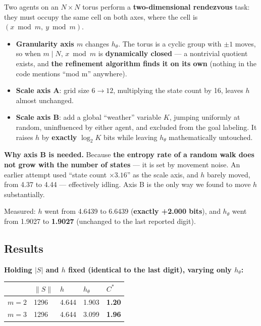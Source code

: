 \documentclass[11pt]{article}
\providecommand{\tightlist}{%
  \setlength{\itemsep}{0pt}\setlength{\parskip}{0pt}}
\renewenvironment{quote}
  {\def\FrameCommand{{\color{gray!60}\vrule width 2pt}\hspace{8pt}}%
   \MakeFramed{\advance\hsize-\width \FrameRestore}\begin{itshape}}
  {\end{itshape}\endMakeFramed}
\begin{document}
Two agents on an \(N\times N\) torus perform a \textbf{two-dimensional rendezvous} task: they must occupy the same cell on both axes, where the cell is \((x\bmod m,\ y\bmod m)\).

\begin{itemize}
\tightlist
\item
  \textbf{Granularity axis \(m\)} changes \(h_\theta\). The torus is a cyclic group with \(\pm1\) moves, so when \(m\mid N\), \(x\bmod m\) is \textbf{dynamically closed} --- a nontrivial quotient exists, and \textbf{the refinement algorithm finds it on its own} (nothing in the code mentions ``mod m'' anywhere).
\item
  \textbf{Scale axis A}: grid size \(6\to12\), multiplying the state count by 16, leaves \(h\) almost unchanged.
\item
  \textbf{Scale axis B}: add a global ``weather'' variable \(K\), jumping uniformly at random, uninfluenced by either agent, and excluded from the goal labeling. It raises \(h\) by \textbf{exactly} \(\log_2K\) bits while leaving \(h_\theta\) mathematically untouched.
\end{itemize}

\begin{quote}
\textbf{Why axis B is needed.} Because \textbf{the entropy rate of a random walk does not grow with the number of states} --- it is set by movement noise. An earlier attempt used ``state count \(\times3.16\)'' as the scale axis, and \(h\) barely moved, from 4.37 to 4.44 --- effectively idling. Axis B is the only way we found to move \(h\) substantially.
\end{quote}

Measured: \(h\) went from 4.6439 to 6.6439 (\textbf{exactly +2.000 bits}), and \(h_\theta\) went from 1.9027 to \textbf{1.9027} (unchanged to the last reported digit).

\hypertarget{results}{%
\subsection{Results}\label{results}}

\textbf{Holding \(|S|\) and \(h\) fixed (identical to the last digit), varying only \(h_\theta\):}

\begin{longtable}[]{@{}lllll@{}}
\toprule
& \(\|S\|\) & \(h\) & \(h_\theta\) & \(C^*\)\tabularnewline
\midrule
\endhead
\(m=2\) & 1296 & 4.644 & 1.903 & \textbf{1.20}\tabularnewline
\(m=3\) & 1296 & 4.644 & 3.099 & \textbf{1.96}\tabularnewline
\bottomrule
\end{longtable}
\end{document}
